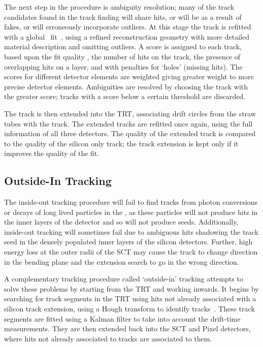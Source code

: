 The next step in the procedure is ambiguity resolution; many of the track
candidates found in the track finding will share hits, or will be as a result of
fakes, or will erroneously incorporate outliers. At this stage the track is
refitted with a global \chisquared\ fit~\cite{1742-6596-119-3-032013}, using a
refined reconstruction geometry with more detailed material description and
omitting outliers.  A score is assigned to each track, based upon the fit
quality \chisquaredndof, the number of hits on the track, the presence of
overlapping hits on a layer, and with penalties for `holes' (missing hits). The
scores for different detector elements are weighted giving greater weight to
more precise detector elements. Ambiguities are resolved by choosing the track
with the greater score; tracks with a score below a certain threshold are
discarded.

The track is then extended into the TRT, associating drift circles from the
straw tubes with the track. The extended tracks are refitted once again, using
the full information of all three detectors. The quality of the extended track
is compared to the quality of the silicon only track; the track extension is
kept only if it improves the quality of the fit.

\subsection{Outside-In Tracking}

The inside-out tracking procedure will fail to find tracks from photon
conversions or decays of long lived particles in the \id, as these
particles will not produce hits in the inner layers of the detector and so will 
not produce seeds. Additionally, inside-out tracking will sometimes
fail due to ambiguous hits shadowing the track seed in the densely populated
inner layers of the silicon detectors. Further, high energy loss at the outer
radii of the SCT may cause the track to change direction in the bending plane
and the extension search to go in the wrong direction. 

A complementary tracking procedure called `outside-in' tracking attempts to
solve these problems by starting from the TRT and working inwards. It begins by
searching for track segments in the TRT using hits not already associated with a silicon
track extension, using a Hough transform to identify
tracks~\cite{Baines:683897}. These track segments are fitted using a Kalman
filter to take into account the drift-time measurements. They are then extended
back into the SCT and Pixel detectors, where hits not already associated to
tracks are associated to them.
